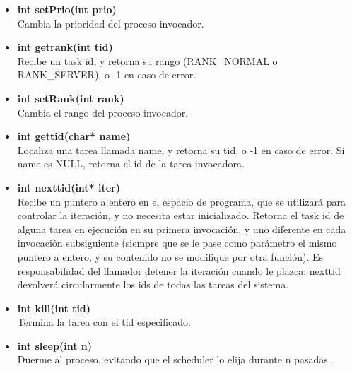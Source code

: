 \documentclass[a4paper,10pt]{article}
\begin{document}
\begin{itemize}
 \item \textbf{int setPrio(int prio)}\\
    \noindent Cambia la prioridad del proceso invocador.

 \item \textbf{int getrank(int tid)}\\
    \noindent Recibe un task id, y retorna su rango (RANK\_NORMAL o RANK\_SERVER), o -1 en caso de error.

 \item \textbf{int setRank(int rank)}\\
    \noindent Cambia el rango del proceso invocador.

 \item \textbf{int gettid(char* name)}\\
    \noindent  Localiza una tarea llamada name, y retorna su tid, o -1 en caso de error. Si name es NULL, retorna el id de la tarea invocadora.

 \item \textbf{int nexttid(int* iter)}\\
    \noindent Recibe un puntero a entero en el espacio de programa, que se utilizará para controlar la iteración, y no necesita estar inicializado. Retorna el task id de alguna tarea en ejecución en su primera invocación, y uno diferente en cada invocación subsiguiente (siempre que se le pase como parámetro el mismo puntero a entero, y su contenido no se modifique por otra función). Es responsabilidad del llamador detener la iteración cuando le plazca: nexttid devolverá circularmente los ids de todas las tareas del sistema.

 \item \textbf{int kill(int tid)}\\
    \noindent Termina la tarea con el tid especificado.

 \item \textbf{int sleep(int n)}\\
    \noindent Duerme al proceso, evitando que el scheduler lo elija durante n pasadas.

\end{itemize}
 
\end{document}

